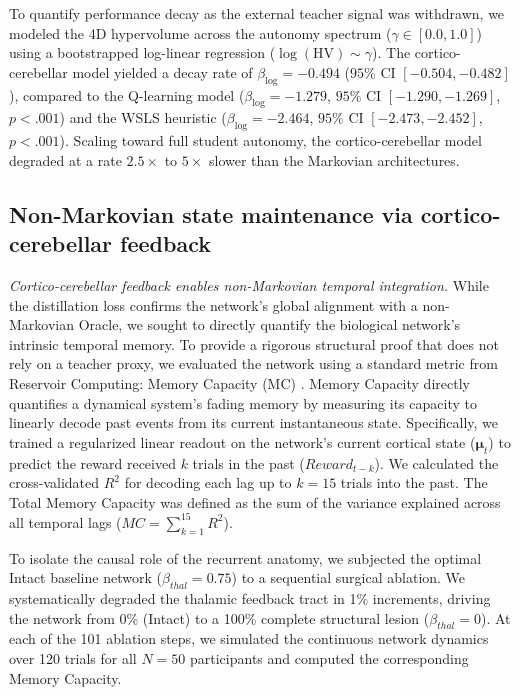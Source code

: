 \documentclass[12pt, a4paper]{extarticle}
\begin{document}
	To quantify performance decay as the external teacher signal was withdrawn, we modeled the 4D hypervolume across the autonomy spectrum ($\gamma \in [0.0, 1.0]$) using a bootstrapped log-linear regression ($\log(\text{HV}) \sim \gamma$). The cortico-cerebellar model yielded a decay rate of $\beta_{\text{log}} = -0.494$ ($95\%$ CI $[-0.504, -0.482]$), compared to the Q-learning model ($\beta_{\text{log}} = -1.279$, $95\%$ CI $[-1.290, -1.269]$, $p < .001$) and the WSLS heuristic ($\beta_{\text{log}} = -2.464$, $95\%$ CI $[-2.473, -2.452]$, $p < .001$). Scaling toward full student autonomy, the cortico-cerebellar model degraded at a rate $2.5\times$ to $5\times$ slower than the Markovian architectures.
	
	\subsection{Non-Markovian state maintenance via cortico-cerebellar feedback}
	
	\textit{Cortico-cerebellar feedback enables non-Markovian temporal integration.}
	While the distillation loss confirms the network's global alignment with a non-Markovian Oracle, we sought to directly quantify the biological network's intrinsic temporal memory. To provide a rigorous structural proof that does not rely on a teacher proxy, we evaluated the network using a standard metric from Reservoir Computing: Memory Capacity (MC) \parencite{jaeger2002}. Memory Capacity directly quantifies a dynamical system's fading memory by measuring its capacity to linearly decode past events from its current instantaneous state. Specifically, we trained a regularized linear readout on the network's current cortical state ($\boldsymbol{\mu}_t$) to predict the reward received $k$ trials in the past ($Reward_{t-k}$). We calculated the cross-validated $R^2$ for decoding each lag up to $k=15$ trials into the past. The Total Memory Capacity was defined as the sum of the variance explained across all temporal lags ($MC = \sum_{k=1}^{15} R^2$).
	
	To isolate the causal role of the recurrent anatomy, we subjected the optimal Intact baseline network ($\beta_{thal} = 0.75$) to a sequential surgical ablation. We systematically degraded the thalamic feedback tract in 1\% increments, driving the network from 0\% (Intact) to a 100\% complete structural lesion ($\beta_{thal} = 0$). At each of the 101 ablation steps, we simulated the continuous network dynamics over 120 trials for all $N=50$ participants and computed the corresponding Memory Capacity.
	
\end{document}
